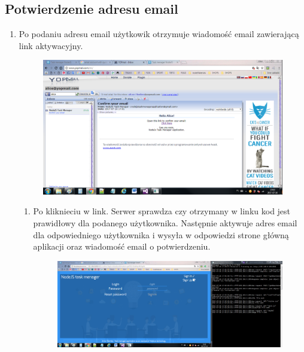 \documentclass[12pt]{report}
\begin{document}
\begin{enumerate}
\subsection{Potwierdzenie adresu email}
\begin{enumerate}
\item Po podaniu adresu email użytkowik otrzymuje wiadomość email zawierającą link aktywacyjny.
\begin{figure}[!t]
\centering
\includegraphics{31.png}
\end{figure}
\begin{enumerate}
\item Po kliknieciu w link. Serwer sprawdza czy otrzymany w linku kod jest prawidłowy dla podanego użytkownika. 
Następnie aktywuje adres email dla odpowiedniego użytkownika i wysyła w odpowiedzi strone główną aplikacji oraz wiadomość email o potwierdzeniu.
\begin{figure}[!t]
\centering
\includegraphics{32.png}
\end{figure}
\end{enumerate}


\end{enumerate}
\end{enumerate}
\end{document}
